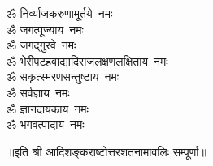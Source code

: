 \begin{multicols}{2}
\begin{flushleft}
        ॐ निर्व्याजकरुणामूर्तये~नमः\\
        ॐ जगत्पूज्याय~नमः\\
        ॐ जगद्गुरवे~नमः\\
        ॐ भेरी\-पटह\-वाद्यादि\-राजलक्षण\-लक्षिताय~नमः\\
        ॐ सकृत्स्मरणसन्तुष्टाय~नमः\\
        ॐ सर्वज्ञाय~नमः\\
        ॐ ज्ञानदायकाय~नमः\\
        ॐ भगवत्पादाय~नमः\hfill{}\\
                                                                                
    \end{flushleft}
\end{multicols}
॥इति श्री आदिशङ्कराष्टोत्तरशतनामावलिः  सम्पूर्णा॥
